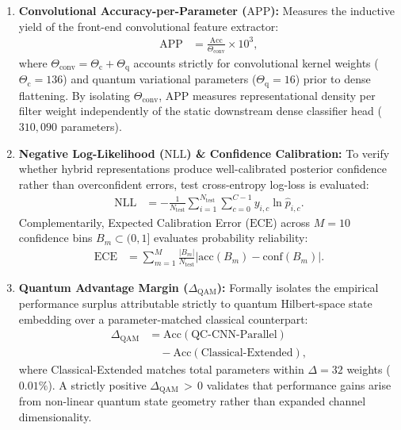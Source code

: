 \documentclass[pdflatex,sn-mathphys-num]{sn-jnl}%
\theoremstyle{thmstyleone}%
\theoremstyle{thmstyletwo}%
\theoremstyle{thmstylethree}%
\begin{document}
\begin{enumerate}
    \item \textbf{Convolutional Accuracy-per-Parameter ($\mathrm{APP}$):} Measures the inductive yield of the front-end convolutional feature extractor:
    \begin{align}
    \mathrm{APP} &= \frac{\mathrm{Acc}}{\Theta_{\mathrm{conv}}} \times 10^3,
    \label{eq:app_metric_exp2}
    \end{align}
    where $\Theta_{\mathrm{conv}} = \Theta_{\mathrm{c}} + \Theta_{\mathrm{q}}$ accounts strictly for convolutional kernel weights ($\Theta_{\mathrm{c}} = 136$) and quantum variational parameters ($\Theta_{\mathrm{q}} = 16$) prior to dense flattening. By isolating $\Theta_{\mathrm{conv}}$, $\mathrm{APP}$ measures representational density per filter weight independently of the static downstream dense classifier head ($310{,}090$ parameters).

    \item \textbf{Negative Log-Likelihood ($\mathrm{NLL}$) \& Confidence Calibration:} To verify whether hybrid representations produce well-calibrated posterior confidence rather than overconfident errors, test cross-entropy log-loss is evaluated:
    \begin{align}
    \mathrm{NLL} &= -\frac{1}{N_{\mathrm{test}}} \sum_{i=1}^{N_{\mathrm{test}}} \sum_{c=0}^{C-1} y_{i,c} \ln \hat{p}_{i,c}.
    \label{eq:nll_metric}
    \end{align}
    Complementarily, Expected Calibration Error ($\mathrm{ECE}$) across $M = 10$ confidence bins $B_m \subset (0, 1]$ evaluates probability reliability:
    \begin{align}
    \mathrm{ECE} &= \sum_{m=1}^{M} \frac{|B_m|}{N_{\mathrm{test}}} \big| \mathrm{acc}(B_m) - \mathrm{conf}(B_m) \big|.
    \label{eq:ece_metric}
    \end{align}

    \item \textbf{Quantum Advantage Margin ($\Delta_{\mathrm{QAM}}$):} Formally isolates the empirical performance surplus attributable strictly to quantum Hilbert-space state embedding over a parameter-matched classical counterpart:
    \begin{align}
    \Delta_{\mathrm{QAM}} &= \mathrm{Acc}(\text{QC-CNN-Parallel}) \nonumber \\
    &\quad - \mathrm{Acc}(\text{Classical-Extended}),
    \label{eq:qam_metric}
    \end{align}
    where Classical-Extended matches total parameters within $\Delta = 32$ weights ($0.01\%$). A strictly positive $\Delta_{\mathrm{QAM}} \,{>}\, 0$ validates that performance gains arise from non-linear quantum state geometry rather than expanded channel dimensionality.


\end{enumerate}
\end{document}
